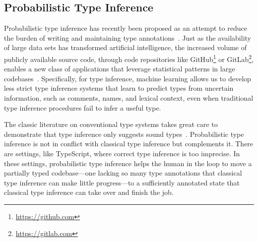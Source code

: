 \documentclass[acmsmall, review, anonymous]{acmart}\settopmatter{printfolios=true,printccs=false,printacmref=false}
\begin{document}
\subsection{Probabilistic Type Inference}

Probabilistic type inference
has recently been proposed as an attempt to reduce the burden
of writing and maintaining type
annotations~\cite{wei20,raychev15,hellendoorn18}.
Just as the availability of large data sets has transformed artificial intelligence,
the increased volume of publicly available source code, through
code repositories like GitHub\footnote{\href{https://github.com}{https://github.com}}
or GitLab\footnote{\href{https://gitlab.com}{https://gitlab.com}},
enables a new class of applications that leverage statistical
patterns in large codebases~\cite{allamanis17}.
Specifically, for type inference, machine learning
allows us to develop less strict type inference systems
that learn to predict types from uncertain information,
such as comments, names, and lexical context,
even when traditional type inference procedures
fail to infer a useful type.

The classic literature on conventional type systems takes great care to demonstrate
that type inference only suggests sound types~\cite{DBLP:journals/jcss/Milner78,Pierce2002}.
Probabilistic type inference is not in conflict with classical type inference but complements it.
There are settings, like TypeScript, where correct type inference is too imprecise.
In these settings, probabilistic type inference helps the human in the loop to move a
partially typed codebase---one lacking so many type annotations that classical type inference
can make little progress---to a sufficiently annotated state that classical type inference can take over and finish the job.
\end{document}
